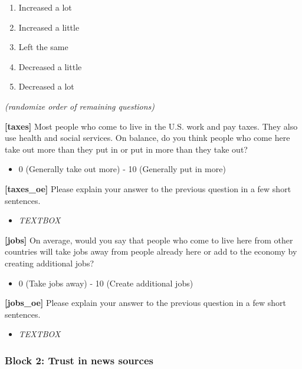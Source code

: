 \documentclass[]{article}
\providecommand{\tightlist}{%
  \setlength{\itemsep}{0pt}\setlength{\parskip}{0pt}}
\begin{document}
\begin{enumerate}
\def\labelenumi{\arabic{enumi}.}
\tightlist
\item
  Increased a lot
\item
  Increased a little
\item
  Left the same
\item
  Decreased a little
\item
  Decreased a lot
\end{enumerate}

\emph{(randomize order of remaining questions)}

\textbf{{[}taxes{]}} Most people who come to live in the U.S. work and
pay taxes. They also use health and social services. On balance, do you
think people who come here take out more than they put in or put in more
than they take out?

\begin{itemize}
\tightlist
\item
  0 (Generally take out more) - 10 (Generally put in more)
\end{itemize}

\textbf{{[}taxes\_oe{]}} Please explain your answer to the previous
question in a few short sentences.

\begin{itemize}
\tightlist
\item
  \emph{TEXTBOX}
\end{itemize}

\textbf{{[}jobs{]}} On average, would you say that people who come to
live here from other countries will take jobs away from people already
here or add to the economy by creating additional jobs?

\begin{itemize}
\tightlist
\item
  0 (Take jobs away) - 10 (Create additional jobs)
\end{itemize}

\textbf{{[}jobs\_oe{]}} Please explain your answer to the previous
question in a few short sentences.

\begin{itemize}
\tightlist
\item
  \emph{TEXTBOX}
\end{itemize}

\hypertarget{block-2-trust-in-news-sources}{%
\subsubsection{Block 2: Trust in news
sources}\label{block-2-trust-in-news-sources}}
\end{document}
